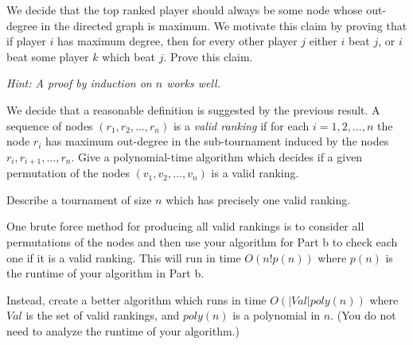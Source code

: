  \begin{questions}
    \question[4]  We decide that the top ranked player should 
 always be some node whose out-degree in the directed graph is maximum. We motivate this claim by proving that if player $i$ has maximum degree, then for every other player $j$ either $i$ beat $j$, or $i$ beat some player $k$ which beat $j$. Prove this claim. 
 
 {\em Hint: A proof by induction on $n$ works well.}

    \ifsolutions\fi
 
     \question[2] We decide that a reasonable definition  is suggested by the previous result. A sequence of nodes $(r_1,r_2, \ldots ,r_n)$ is a \emph{valid ranking} if for each $i=1,2, \ldots ,n$ the node $r_i$ has maximum out-degree in the sub-tournament induced by the nodes $r_i,r_{i+1}, \ldots ,r_n$. Give a polynomial-time algorithm which decides if a given permutation of the nodes $(v_1,v_2, \ldots ,v_n)$ is a valid ranking.

     \ifsolutions\fi 

      \question[2] Describe a tournament of size $n$ which has precisely one valid ranking.

     \ifsolutions\fi 
      
     \question[4] One brute force method for  
      producing all valid rankings is to consider all permutations of the nodes and then use your algorithm for Part b to check each one if it is a valid ranking. This will run in time $O(n! p(n))$ where $p(n)$ is the runtime of your algorithm in Part b.

      Instead, create a better algorithm which runs in time $O(|Val| poly(n))$ where $Val$ is the set of valid rankings, and $poly(n)$ is a polynomial in $n$. (You do not need to analyze the runtime of your algorithm.)
 
     \ifsolutions\fi
 \end{questions}
